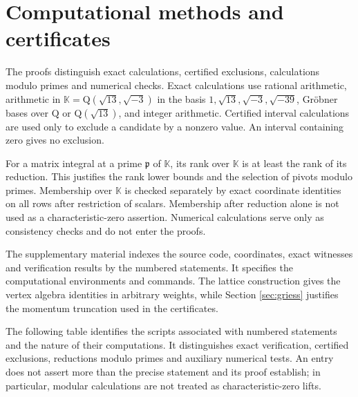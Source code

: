 \documentclass[leqno]{article}
\newcommand{\K}{\ensuremath{\mathbb{K}}}
\newcommand{\Q}{\mathrm{Q}}
\numberwithin{equation}{section}
\begin{document}
\appendix
\section{Computational methods and certificates}
\label{app:computations}

The proofs distinguish exact calculations, certified exclusions, calculations modulo primes and numerical checks. Exact calculations use rational arithmetic, arithmetic in $\K = \Q(\sqrt{13},\sqrt{-3})$ in the basis $1,\sqrt{13},\sqrt{-3},\sqrt{-39}$, Gröbner bases over $\Q$ or $\Q(\sqrt{13})$, and integer arithmetic. Certified interval calculations are used only to exclude a candidate by a nonzero value. An interval containing zero gives no exclusion.

For a matrix integral at a prime $\mathfrak p$ of $\K$, its rank over $\K$ is at least the rank of its reduction. This justifies the rank lower bounds and the selection of pivots modulo primes. Membership over $\K$ is checked separately by exact coordinate identities on all rows after restriction of scalars. Membership after reduction alone is not used as a characteristic-zero assertion. Numerical calculations serve only as consistency checks and do not enter the proofs.

The supplementary material indexes the source code, coordinates, exact witnesses and verification results by the numbered statements. It specifies the computational environments and commands. The lattice construction gives the vertex algebra identities in arbitrary weights, while Section \ref{sec:griess} justifies the momentum truncation used in the certificates.

The following table identifies the scripts associated with numbered statements and the nature of their computations. It distinguishes exact verification, certified exclusions, reductions modulo primes and auxiliary numerical tests. An entry does not assert more than the precise statement and its proof establish; in particular, modular calculations are not treated as characteristic-zero lifts.
\end{document}
